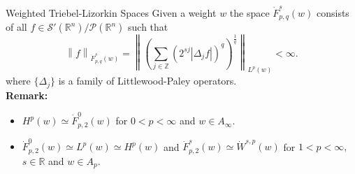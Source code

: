 \documentclass[xcolor=dvipsnames]{beamer}
\newcommand{\re}{\mathbb{R}}
\newcommand{\rn}{{{\mathbb R}^n}}
\newcommand{\ent}{\mathbb{Z}}
\newcommand{\abs}[1]{\vert #1 \vert}
\newcommand{\fr}[2]{{\textstyle \frac{#1}{#2}}}
\newcommand{\norm}[2]{{\left\| #1 \right\|}_{#2}}
\newcommand{\sw}{{\mathcal{S}}(\rn)}
\newcommand{\dx}{\, dx}
\newcommand{\swp}{{\mathcal{S}'}(\rn)}
\newcommand{\tlw}[4]{\dot F_{#1,#3}^{#2}(#4)} %
\newcommand{\lebw}[2]{L^{#1}(#2)} %
\begin{document}
\begin{frame}{Weighted Triebel-Lizorkin Spaces}
Given a weight $w$ the space $\tlw{p}{s}{q}{w}$ consists of all $f\in \swp/\mathcal{P}(\rn)$ such that 
\begin{equation*}
\norm{f}{\tlw{p}{s}{q}{w}}=\norm{\left(\sum_{j\in\ent}(2^{sj}|\Delta	_jf|)^q\right)^{\frac{1}{q}}}{\lebw{p}{w}}<\infty.
\end{equation*}
where $\{\Delta_j\}$ is a family of Littlewood-Paley operators.
\\
\bigskip
 {\bf Remark:} 
 \begin{itemize}
  \item $H^p(w)\simeq\tlw{p}{0}{2}{w}$  for $0<p<\infty$ and $w\in A_\infty.$ 
 \item $\tlw{p}{0}{2}{w}\simeq L^p(w)\simeq H^p(w)$ and $\tlw{p}{s}{2}{w}\simeq \dot{W}^{s,p}(w)$ for $1<p<\infty,$ $s\in\re$ and $w\in A_p.$  
\end{itemize}


\end{frame}


\end{document}

